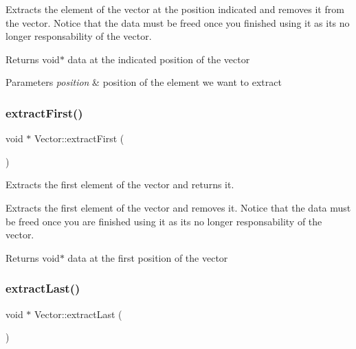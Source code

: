 Extracts the element of the vector at the position indicated and removes it from the vector. Notice that the data must be freed once you finished using it as it\textquotesingle{}s no longer responsability of the vector.

\begin{DoxyReturn}{Returns}
void$\ast$ data at the indicated position of the vector 
\end{DoxyReturn}

\begin{DoxyParams}{Parameters}
{\em position} & position of the element we want to extract \\
\hline
\end{DoxyParams}
\mbox{\label{class_vector_adc981406679edbd18e0125dd7d322229}} 
\subsubsection{\texorpdfstring{extract\+First()}{extractFirst()}}
{\footnotesize\ttfamily void $\ast$ Vector\+::extract\+First (\begin{DoxyParamCaption}{ }\end{DoxyParamCaption})}



Extracts the first element of the vector and returns it. 

Extracts the first element of the vector and removes it. Notice that the data must be freed once you are finished using it as it\textquotesingle{}s no longer responsability of the vector.

\begin{DoxyReturn}{Returns}
void$\ast$ data at the first position of the vector 
\end{DoxyReturn}
\mbox{\label{class_vector_ae7cf9b7f0c345589098036e367b5729f}} 
\subsubsection{\texorpdfstring{extract\+Last()}{extractLast()}}
{\footnotesize\ttfamily void $\ast$ Vector\+::extract\+Last (\begin{DoxyParamCaption}{ }\end{DoxyParamCaption})}



